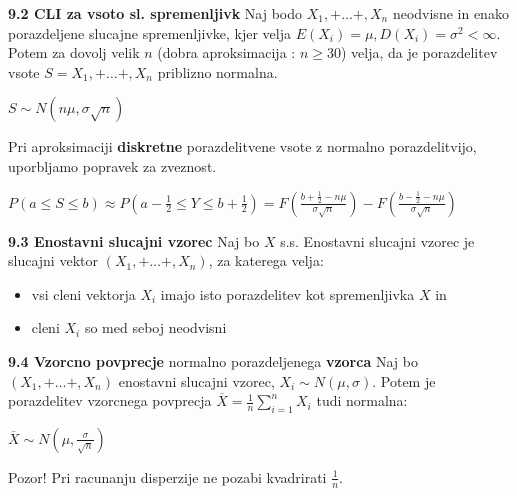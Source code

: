 \documentclass{article}
\begin{document}
\begin{multicols}{3}
\textbf{9.2 CLI za vsoto sl. spremenljivk}
Naj bodo $X_1, + \dots +, X_n$ neodvisne in enako porazdeljene
slucajne spremenljivke, kjer velja $E(X_i) = \mu, D(X_i) = \sigma^2 < \infty$. Potem za 
dovolj velik $n$ (dobra aproksimacija : $n \geq 30$)  velja, da je porazdelitev vsote
$S = X_1, + \dots +, X_n$ priblizno normalna.

\begin{center}
    \begin{math}
        S \sim  N(n \mu, \sigma \sqrt{n})
    \end{math}
\end{center}

Pri aproksimaciji \textbf{diskretne} porazdelitvene vsote z normalno porazdelitvijo, uporbljamo
popravek za zveznost.

\begin{center}
    \begin{math}
        P(a \leq S \leq b) \approx P(a - \frac{1}{2} \leq Y \leq b + \frac{1}{2}) =
        F(
            \frac{b + \frac{1}{2} - n \mu}{\sigma \sqrt{n}}
        ) -
        F(
            \frac{b - \frac{1}{2} - n \mu}{\sigma \sqrt{n}}
        )
    \end{math}
\end{center}

\textbf{9.3 Enostavni slucajni vzorec}
Naj bo $X$ s.s. Enostavni slucajni vzorec je slucajni vektor $(X_1, + \dots +, X_n)$,
za katerega velja:
\begin{itemize}
    \item vsi cleni vektorja $X_i$ imajo isto porazdelitev kot spremenljivka $X$ in
    \item cleni $X_i$ so med seboj neodvisni
\end{itemize}

\textbf{9.4 Vzorcno povprecje} normalno porazdeljenega \textbf{vzorca}
Naj bo  $(X_1, + \dots +, X_n)$ enostavni slucajni vzorec, $X_i \sim N(\mu, \sigma)$.
Potem je porazdelitev vzorcnega povprecja $\overline{X} = \frac{1}{n} \sum_{i = 1}^{n} X_i$
tudi normalna:
\begin{center}
    \begin{math}
        \overline{X} \sim N(\mu, \frac{\sigma}{\sqrt{n}})
    \end{math}
\end{center}

Pozor! Pri racunanju disperzije ne pozabi kvadrirati \textbf{$\frac{1}{n}$}.


\end{multicols}
\end{document}
